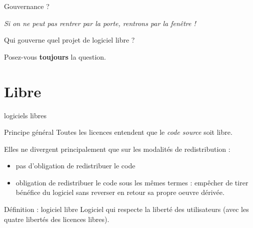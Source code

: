 \documentclass{beamer}
\begin{document}
\begin{frame}{Gouvernance ?}
  
  \textit{Si on ne peut pas rentrer par la porte, rentrons par la
    fenêtre !}

  Qui gouverne quel projet de logiciel libre ?

  Posez-vous \textbf{toujours} la question.

\end{frame}




\section{Libre}

\begin{frame}{logiciels libres}

  \begin{alertblock}{Principe général}
    Toutes les licences entendent que le \textit{code source} soit
    libre.
  \end{alertblock}
  Elles ne divergent principalement que sur les modalités de
  redistribution :
  \begin{itemize}
  \item pas d'obligation de redistribuer le code
  \item obligation de redistribuer le code sous les mêmes termes :
    empêcher de tirer bénéfice du logiciel sans reverser en retour sa
    propre oeuvre dérivée.
  \end{itemize}

  \begin{alertblock}{Définition : logiciel libre}
    Logiciel qui respecte la liberté des utilisateurs (avec les quatre
    libertés des licences libres).
  \end{alertblock}
  
\end{frame}

\end{document}
